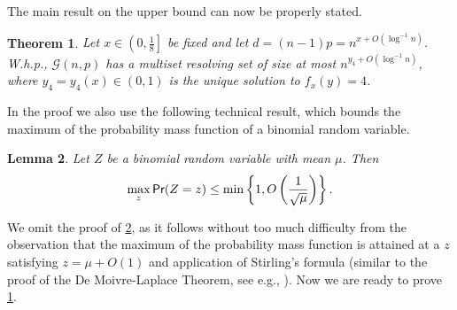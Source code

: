 \documentclass[12pt]{article}
\newtheorem{theorem}{Theorem}
\newtheorem{lemma}[theorem]{Lemma}
\theoremstyle{definition}
\theoremstyle{remark}
\theoremstyle{remark}
\numberwithin{theorem}{section}
\newcommand{\prob}{\textsf{\upshape Pr}}
\newcommand{\Gnp}{\mathcal{G}(n,p)}
\begin{document}
The main result on the upper bound can now be properly stated.

\begin{theorem}\label{thm:upper_bound} Let $x \in \left(0, \frac{1}{8} \right]$ be fixed and let $d = (n-1)p = n^{x + O(\log^{-1}n)}$. W.h.p., $\Gnp$ has a multiset resolving set of size at most $n^{y_{4} +O(\log^{-1}n)}$, where $y_{4} = y_{4}(x) \in (0,1)$ is the unique solution to $f_{x}(y) = 4$.
\end{theorem}

In the proof we also use the following technical result, which bounds the maximum of the probability mass function of a binomial random variable. 

\begin{lemma}\label{lem:binomial}
	Let $Z$ be a binomial random variable with mean $\mu$. Then 
	$$
		\max_{z}\prob(Z = z) \leq \min\left\{1, O\left(\frac{1}{\sqrt{\mu}} \right)\right\}.
	$$
\end{lemma}

We omit the proof of \cref{lem:binomial}, as it follows without too much difficulty from the observation that the maximum of the probability mass function is attained at a $z$ satisfying $z = \mu + O(1)$ and application of Stirling's formula (similar to the proof of the De Moivre-Laplace Theorem, see e.g., \cite[VII.3, Theorem 1]{feller1957introduction}). Now we are ready to prove \cref{thm:upper_bound}.
\end{document}
